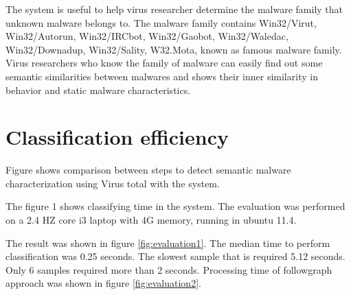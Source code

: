 The system is useful to help virus researcher determine the malware family that unknown malware belongs to. The malware family contains Win32/Virut, Win32/Autorun, Win32/IRCbot, Win32/Gaobot, Win32/Waledac, Win32/Downadup, Win32/Sality, W32.Mota, known as famous malware family. Virus researchers who know the family of malware can easily find out some semantic similarities between malwares and shows their inner similarity in behavior and static malware characteristics.

\section{Classification efficiency}
Figure shows comparison between steps to detect semantic malware characterization using Virus total with the system.

The figure 1 shows classifying time in the system. The evaluation was performed on a 2.4 HZ core i3 laptop with 4G memory, running in ubuntu 11.4. 	

The result was shown in figure \ref{fig:evaluation1}. The median time to perform classification was 0.25 seconds. The slowest sample that is required 5.12 seconds. Only 6 samples required more than 2 seconds. Processing time of followgraph approach was shown in figure \ref{fig:evaluation2}.

